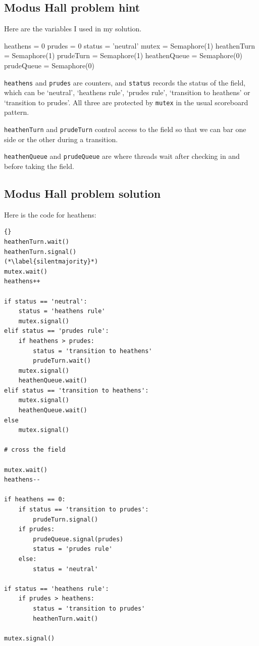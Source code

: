 \documentclass{book}
\begin{document}
\subsection {Modus Hall problem hint}

Here are the variables I used in my solution.

\begin{unbreakable}[title={Modus problem hint}]{}
heathens = 0
prudes = 0
status = 'neutral'
mutex = Semaphore(1)
heathenTurn = Semaphore(1)
prudeTurn = Semaphore(1)
heathenQueue = Semaphore(0)
prudeQueue = Semaphore(0)
\end{unbreakable}

{\tt heathens} and {\tt prudes} are counters, and {\tt status} records
the status of the field, which can be `neutral', `heathens rule',
`prudes rule', `transition to heathens' or `transition to prudes'.
All three are protected by {\tt mutex} in the usual scoreboard
pattern.

    {\tt heathenTurn} and {\tt prudeTurn} control access to the field
so that we can bar one side or the other during a transition.

    {\tt heathenQueue} and {\tt prudeQueue} are where threads wait after
checking in and before taking the field.



\subsection {Modus Hall problem solution}

Here is the code for heathens:

\begin{lstlisting}[title={Modus problem solution}]{}
heathenTurn.wait()
heathenTurn.signal()
(*\label{silentmajority}*)
mutex.wait()
heathens++

if status == 'neutral':
    status = 'heathens rule'
    mutex.signal()
elif status == 'prudes rule':
    if heathens > prudes:
        status = 'transition to heathens'
        prudeTurn.wait()
    mutex.signal()
    heathenQueue.wait()
elif status == 'transition to heathens':
    mutex.signal()
    heathenQueue.wait()
else
    mutex.signal()

# cross the field

mutex.wait()
heathens--

if heathens == 0:
    if status == 'transition to prudes':
        prudeTurn.signal()
    if prudes:
        prudeQueue.signal(prudes)
        status = 'prudes rule'
    else:
        status = 'neutral'
        
if status == 'heathens rule':
    if prudes > heathens:
        status = 'transition to prudes'
        heathenTurn.wait()

mutex.signal()
\end{lstlisting}
\end{document}
